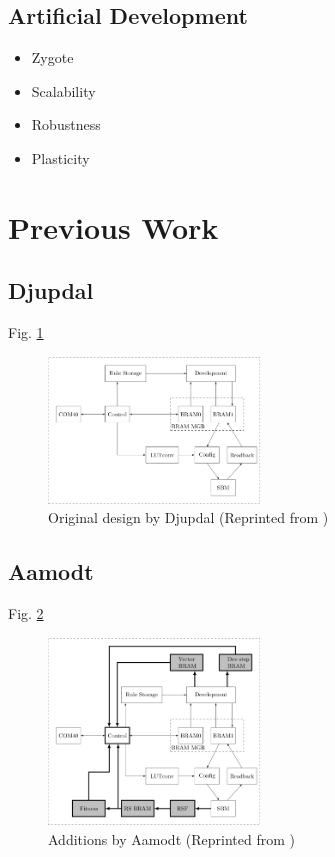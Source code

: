 \documentclass[a4paper]{IEEEtran}
\begin{document}
\subsection{Artificial Development \cite{harding2008artificial}}
\begin{itemize}
    \item Zygote
    \item Scalability
    \item Robustness
    \item Plasticity
\end{itemize}

\section{Previous Work}

\subsection{Djupdal \cite{djupdal2003sblock}}

Fig. \ref{fig:ca-djupdal}

\begin{figure}[h!]
    \centering
    \includegraphics[width=0.5\textwidth]{figures/ca-djupdal}
    \caption{Original design by Djupdal (Reprinted from \cite{stovneng2014sblock})}
    \label{fig:ca-djupdal}
\end{figure}

\subsection{Aamodt \cite{aamodt2005sblock}}

Fig. \ref{fig:ca-aamodt}

\begin{figure}[h!]
    \centering
    \includegraphics[width=0.5\textwidth]{figures/ca-aamodt}
    \caption{Additions by Aamodt (Reprinted from \cite{stovneng2014sblock})}
    \label{fig:ca-aamodt}
\end{figure}
\end{document}
